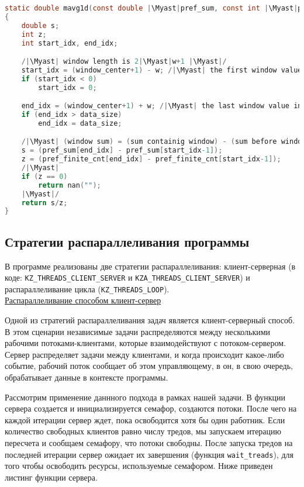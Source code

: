 \begin{lstlisting}[language=C, caption={Расчет значения фильтра в окне с помощью префиксных сумм и количеств}, escapeinside=||]
static double mavg1d(const double |\Myast|pref_sum, const int |\Myast|pref_finite_cnt, int length, int col, int w)
{
    double s;
    int z;
    int start_idx, end_idx;

    /|\Myast| window length is 2|\Myast|w+1 |\Myast|/
    start_idx = (window_center+1) - w; /|\Myast| the first window value index |\Myast|/
    if (start_idx < 0)
        start_idx = 0;

    end_idx = (window_center+1) + w; /|\Myast| the last window value index |\Myast|/
    if (end_idx > data_size)
        end_idx = data_size;

    /|\Myast| (window sum) = (sum containig window) - (sum before window) |\Myast|/
    s = (pref_sum[end_idx] - pref_sum[start_idx-1]);
    z = (pref_finite_cnt[end_idx] - pref_finite_cnt[start_idx-1]);
    /|\Myast|
    if (z == 0) 
        return nan("");
    |\Myast|/
    return s/z;
}
\end{lstlisting}

\subsection*{Стратегии распараллеливания программы}

В программе реализованы две стратегии распараллеливания: клиент-серверная (в коде: \texttt{KZ\_THREADS\_CLIENT\_SERVER} и \texttt{KZA\_THREADS\_CLIENT\_SERVER}) и распараллеливание цикла (\texttt{KZ\_THREADS\_LOOP}).
\\
\underline{Распараллеливание способом клиент-сервер}

Одной из стратегий распараллеливания задач является клиент-серверный способ. В этом сценарии независимые задачи распределяются между несколькими рабочими потоками-клиентами, которые взаимодействуют с потоком-сервером. Сервер распределяет задачи между клиентами, и когда происходит какое-либо событие, рабочий поток сообщает об этом управляющему, в он, в свою очередь, обрабатывает данные в контексте программы.

Рассмотрим применение даннного подхода в рамках нашей задачи. В функции сервера создается и инициализируется семафор, создаются потоки. После чего на каждой итерации сервер ждет, пока освободится хотя бы один работник. Если количество свободных клиентов равно числу тредов, мы запускаем итерацию пересчета и сообщаем семафору, что потоки свободны. После запуска тредов на последней итерации сервер ожидает их завершения (функция \texttt{wait\_treads}), для того чтобы освободить ресурсы, используемые семафором.
Ниже приведен листинг функции сервера.

